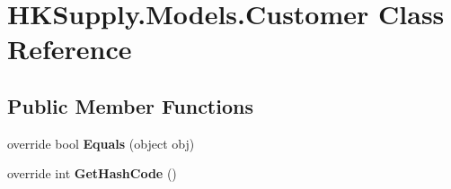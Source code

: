 \hypertarget{class_h_k_supply_1_1_models_1_1_customer}{}\section{H\+K\+Supply.\+Models.\+Customer Class Reference}
\label{class_h_k_supply_1_1_models_1_1_customer}
\subsection*{Public Member Functions}
\begin{DoxyCompactItemize}
\item 
\mbox{\label{class_h_k_supply_1_1_models_1_1_customer_a7e21d342fe37d5133dbaff9c32f35d05}} 
override bool {\bfseries Equals} (object obj)
\item 
\mbox{\label{class_h_k_supply_1_1_models_1_1_customer_a1277096021a0d574871c50508c576f85}} 
override int {\bfseries Get\+Hash\+Code} ()
\end{DoxyCompactItemize}
